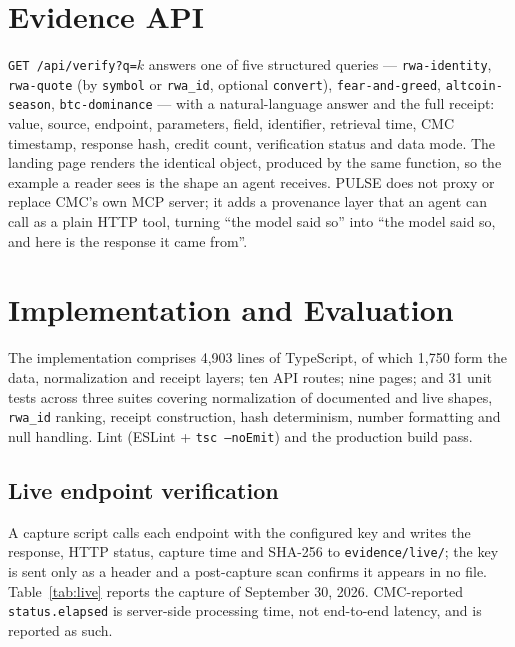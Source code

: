\documentclass[11pt]{article}
\newcommand{\code}[1]{\texttt{\small #1}}
\begin{document}
\section{Evidence API}

\code{GET /api/verify?q=}\(k\) answers one of five structured queries --- \code{rwa-identity}, \code{rwa-quote} (by \code{symbol} or \code{rwa\_id}, optional \code{convert}), \code{fear-and-greed}, \code{altcoin-season}, \code{btc-dominance} --- with a natural-language answer and the full receipt: value, source, endpoint, parameters, field, identifier, retrieval time, CMC timestamp, response hash, credit count, verification status and data mode. The landing page renders the identical object, produced by the same function, so the example a reader sees is the shape an agent receives. \textsc{PULSE} does not proxy or replace CMC's own MCP server; it adds a provenance layer that an agent can call as a plain HTTP tool, turning ``the model said so'' into ``the model said so, and here is the response it came from''.

\section{Implementation and Evaluation}

The implementation comprises 4,903 lines of TypeScript, of which 1,750 form the data, normalization and receipt layers; ten API routes; nine pages; and 31 unit tests across three suites covering normalization of documented and live shapes, \code{rwa\_id} ranking, receipt construction, hash determinism, number formatting and null handling. Lint (ESLint + \code{tsc --noEmit}) and the production build pass.

\subsection{Live endpoint verification}
A capture script calls each endpoint with the configured key and writes the response, HTTP status, capture time and SHA-256 to \code{evidence/live/}; the key is sent only as a header and a post-capture scan confirms it appears in no file. Table~\ref{tab:live} reports the capture of September 30, 2026. CMC-reported \code{status.elapsed} is server-side processing time, not end-to-end latency, and is reported as such.
\end{document}
